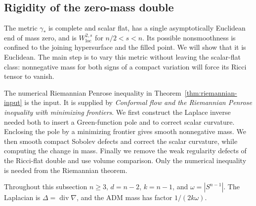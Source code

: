\subsection{Rigidity of the zero-mass double}
\label{subsec:static:zero-mass}

The metric $\gamma_*$ is complete and scalar flat, has a single
asymptotically Euclidean end of mass zero, and is $W^{2,s}_{\mathrm{loc}}$
for $n/2<s<n$.  Its possible nonsmoothness is confined to the joining
hypersurface and the filled point.  We will show that it is Euclidean.
The main step is to vary this metric without leaving the scalar-flat
class: nonnegative mass for both signs of a compact variation will
force its Ricci tensor to vanish.

The numerical Riemannian Penrose inequality in
Theorem~\ref{thm:riemannian-input} is the input.  It is supplied by
\emph{Conformal flow and the Riemannian Penrose inequality with
minimizing frontiers}.  We first construct the Laplace inverse needed
both to insert a Green-function pole and to correct scalar curvature.
Enclosing the pole by a minimizing frontier gives smooth nonnegative
mass.  We then smooth compact Sobolev defects and correct the scalar
curvature, while computing the change in mass.  Finally we remove the
weak regularity defects of the Ricci-flat double and use volume
comparison.  Only the numerical
inequality is needed from the Riemannian theorem.

Throughout this subsection $n\ge3$, $d=n-2$, $k=n-1$, and
$\omega=|S^{n-1}|$.  The Laplacian is $\Delta=\operatorname{div}\nabla$,
and the ADM mass has factor $1/(2k\omega)$.

